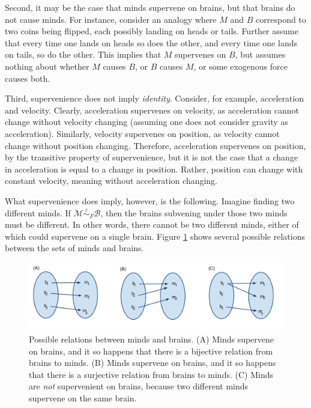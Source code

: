 \documentclass{article}
\newcommand{\mB}{\mathcal{B}}
\newcommand{\mM}{\mathcal{M}}
\newcommand{\MeB}{\mM \overset{\varepsilon}{{\sim}}_F \mB}
\begin{document}

Second, it may be the case that minds supervene on brains, but that brains do not cause minds.  For instance, consider an analogy where $M$ and $B$ correspond to two coins being flipped, each possibly landing on heads or tails.  Further assume that every time one lands on heads so does the other, and every time one lands on tails, so do the other. This implies that $M$ supervenes on $B$, but assumes nothing about whether $M$ causes $B$, or $B$ causes $M$, or some exogenous force causes both.  


Third, supervenience does not imply \emph{identity}.  Consider, for example, acceleration and velocity.  Clearly, acceleration supervenes on velocity, as acceleration cannot change without velocity changing (assuming one does not consider gravity as acceleration).  Similarly, velocity supervenes on position, as velocity cannot change without position changing.  Therefore, acceleration supervenes on position, by the transitive property of supervenience, but it is not the case that a change in acceleration is equal to a change in position.  Rather, position can change with constant velocity, meaning without acceleration changing.  

What supervenience does imply, however, is the following.   Imagine finding two different minds.  If $\MeB$, then the brains subvening under those two minds must be different.  In other words, there cannot be two different minds, either of which could supervene on a single brain.  Figure \ref{fig:rel} shows several possible relations between the sets of minds and brains.

\begin{figure}[htbp]
	\centering
		\includegraphics[width=1\linewidth]{supervenience_relations.pdf}
	\caption{Possible relations between minds and brains.  (A) Minds supervene on brains, and it so happens that there is a bijective relation from brains to minds.  (B) Minds supervene on brains, and it so happens that there is a surjective relation from brains to minds. (C) Minds are \emph{not} supervenient on brains, because two different minds supervene on the same brain.}
	\label{fig:rel}
\end{figure}
\end{document}

